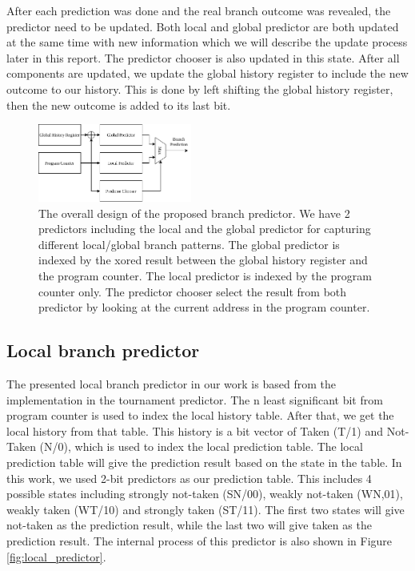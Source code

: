 \documentclass[conference]{IEEEtran}
\begin{document}
After each prediction was done and the real branch outcome was revealed, the predictor need to be updated.
Both local and global predictor are both updated at the same time with new information which we will describe
the update process later in this report. The predictor chooser is also updated in this state. After all
components are updated, we update the global history register to include the new outcome to our history.
This is done by left shifting the global history register, then the new outcome is added to its last bit.


\begin{figure}[h]
    \centering
    \includegraphics[width=0.45\textwidth]{imgs/overall_design}
    \caption{The overall design of the proposed branch predictor. We have 2 predictors including
    the local and the global predictor for capturing different local/global branch patterns. The
    global predictor is indexed by the xored result between the global history register and the program
    counter. The local predictor is indexed by the program counter only. The predictor chooser select
    the result from both predictor by looking at the current address in the program counter.}
    \label{fig:overall_design}
\end{figure}

\subsection{Local branch predictor}

The presented local branch predictor in our work is based from the implementation in the tournament
predictor. The n least significant bit from program counter is used to index the local history table.
After that, we get the local history from that table. This history is a bit vector of Taken (T/1) and Not-Taken
(N/0), which is used to index the local prediction table. The local prediction table will give the
prediction result based on the state in the table. In this work, we used 2-bit predictors as our
prediction table. This includes 4 possible states including strongly not-taken (SN/00),
weakly not-taken (WN,01), weakly taken (WT/10) and strongly taken (ST/11). The first two states
will give not-taken as the prediction result, while the last two will give taken as the prediction
result. The internal process of this predictor is also shown in Figure \ref{fig:local_predictor}.
\end{document}

